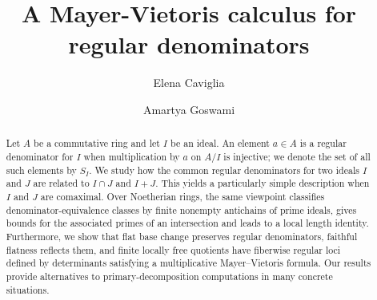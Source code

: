 \documentclass[11pt,leqno]{amsart}
\theoremstyle{definition}
\numberwithin{equation}{section}
\begin{document}
\let\WriteBookmarks\relax
\def\floatpagepagefraction{1}
\def\textpagefraction{.001}

\title{A Mayer-Vietoris calculus for regular denominators}

\author{Elena Caviglia}
\address{[1] Department of Mathematics, Stellenbosch University, South Africa; [2] National Institute for Theoretical and Computational Sciences (NITheCS), South Africa}


\author{Amartya Goswami}
\address{[1] Department of Mathematics and Applied Mathematics, University of Johannesburg,
P.O. Box 524, Auckland Park 2006, South Africa; [2] National Institute for Theoretical and Computational Sciences (NITheCS), South Africa}

\begin{abstract}
	Let $A$ be a commutative ring and let $I$ be an ideal. An element $a\in A$ is a regular denominator for $I$ when multiplication by $a$ on $A/I$ is injective; we denote the set of all such elements by $S_I$. We study how the common regular denominators for two ideals $I$ and $J$ are related to $I\cap J$ and $I+J$. This yields a particularly simple description when $I$ and $J$ are comaximal. Over Noetherian rings, the same viewpoint classifies denominator-equivalence classes by finite nonempty antichains of prime ideals, gives bounds for the associated primes of an intersection and leads to a local length identity. Furthermore, we show that flat base change preserves regular denominators, faithful flatness reflects them, and finite locally free quotients have fiberwise regular loci defined by determinants satisfying a multiplicative Mayer--Vietoris formula.  Our results provide alternatives to primary-decomposition computations in many concrete situations.
\end{abstract}


\maketitle
\end{document}
